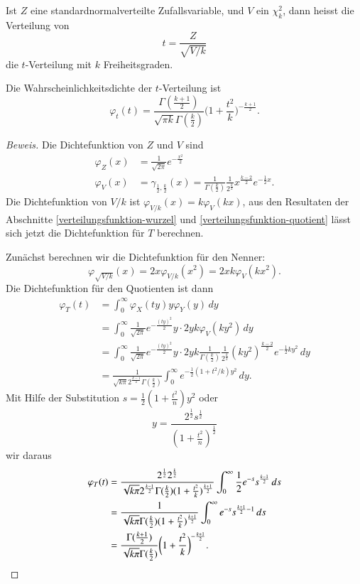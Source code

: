 \begin{definition}
Ist $Z$ eine standardnormalverteilte Zufallsvariable, und $V$ ein
$\chi_k^2$, dann heisst die Verteilung von
\[
t=\frac{Z}{\sqrt{V/k}}
\]
die $t$-Verteilung mit $k$ Freiheitsgraden.
\end{definition}

\begin{satz}Die Wahrscheinlichkeitsdichte der $t$-Verteilung ist
\begin{equation}
\varphi_t(t)
=
\frac{\Gamma(\frac{k+1}{2})}{\sqrt{\pi k}\Gamma(\frac{k}2)}
\biggl(1+\frac{t^2}{k}\biggr)^{-\frac{k+1}2}.
\end{equation}
\end{satz}

\begin{proof}[Beweis]
Die Dichtefunktion von $Z$ und $V$ sind
\begin{align*}
\varphi_Z(x)
&=
\frac1{\sqrt{2\pi}}e^{-\frac{x^2}2}
\\
\varphi_V(x)
&=
\gamma_{\frac12,\frac{k}2}(x)
=
\frac1{\Gamma(\frac{k}2)}\frac1{2^\frac{k}2}x^{\frac{k-2}2}e^{-\frac12x}.
\end{align*}
Die Dichtefunktion von $V/k$ ist $\varphi_{V/k}(x)=k\varphi_V(kx)$, aus
den Resultaten der Abschnitte \ref{verteilungsfunktion-wurzel}
und \ref{verteilungsfunktion-quotient} lässt sich jetzt die
Dichtefunktion für $T$ berechnen.

Zunächst berechnen wir die Dichtefunktion für den Nenner:
\[
\varphi_{\sqrt{V/k}}(x)=2x\varphi_{V/k}(x^2)=2xk\varphi_V(kx^2).
\]
Die Dichtefunktion für den Quotienten ist dann
\begin{align*}
\varphi_T(t)
&=
\int_0^\infty \varphi_X(ty)y\varphi_Y(y)\,dy
\\
&=
\int_0^\infty \frac1{\sqrt{2\pi}}e^{-\frac{(ty)^2}2}y\cdot
2yk\varphi_V(ky^2)\,dy
\\
&=
\int_0^\infty \frac1{\sqrt{2\pi}}e^{-\frac{(ty)^2}2}y\cdot
2yk
\frac1{\Gamma(\frac{k}2)}\frac1{2^{\frac{k}2}}(ky^2)^{\frac{k-2}2}e^{-\frac12ky^2}
\,dy
\\
&=
\frac1{\sqrt{k\pi}2^{\frac{k-1}2}\Gamma(\frac{k}2)}
\int_0^\infty e^{-\frac12(1+t^2/k)y^2} \,dy.
\end{align*}
Mit Hilfe der Substitution $s=\frac12(1+\frac{t^2}n)y^2$
oder
\[
y=\frac{2^{\frac12}s^{\frac12}}{(1+\frac{t^2}n)^{\frac12}}
\]
wir daraus
\begin{align*}
\varphi_T(t)
&=
\frac{2^{\frac12}2^{\frac{k}2}}{\sqrt{k\pi}2^{\frac{k-1}2}\Gamma(\frac{k}2)(1+\frac{t^2}k)^{\frac{k+1}2}}
\int_0^\infty \frac12e^{-s}s^{\frac{k-1}2}\,ds
\\
&=
\frac{1}{\sqrt{k\pi}\Gamma(\frac{k}2)(1+\frac{t^2}k)^{\frac{k+1}2}}
\int_0^\infty e^{-s}s^{\frac{k+1}2-1}\,ds
\\
&=
\frac{\Gamma(\frac{k+1}2)}{\sqrt{k\pi}\Gamma(\frac{k}2)}\biggl(1+\frac{t^2}k\biggr)^{-\frac{k+1}2}.
\qedhere
\end{align*}
\end{proof}

